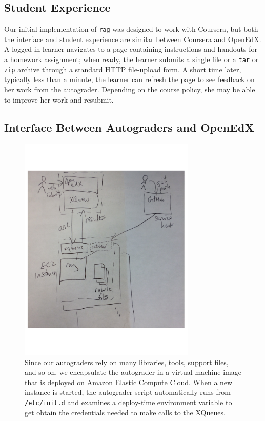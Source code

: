 \subsection{Student Experience}

Our initial implementation of \texttt{rag} was designed to work with
Coursera, but both the interface and student experience are similar
between Coursera and OpenEdX.  A logged-in learner navigates to a page
containing instructions and handouts for a homework assignment;
when ready, the learner submits a single file or a
\texttt{tar} or \texttt{zip} archive through a standard HTTP
file-upload form.  A short time later, typically less than a minute, the
learner can refresh the page to see feedback on her work from the
autograder.  Depending on the course policy, she may be able to improve
her work and resubmit.

\subsection{Interface Between Autograders and OpenEdX}

\begin{figure}
  \centering
  \includegraphics[width=0.75\textwidth]{figs/autograder_arch.pdf}
  \caption{\label{fig:arch}
  Since our autograders rely on many libraries,
  tools, support files, and so on, we encapsulate the autograder in a
  virtual machine image that is deployed on Amazon Elastic Compute Cloud.
  When a new instance is started, the autograder script automatically runs from
  \texttt{/etc/init.d} and examines a deploy-time environment variable
  to get obtain the credentials needed to make calls to the XQueues.}
\end{figure}

